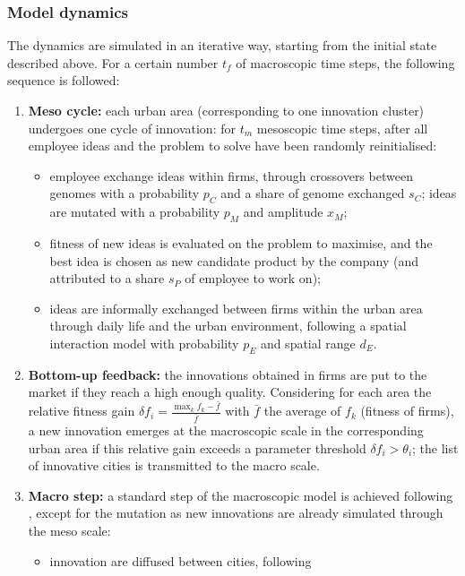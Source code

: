 \documentclass[letterpaper]{article}
\begin{document}
\subsubsection{Model dynamics}

The dynamics are simulated in an iterative way, starting from the initial state described above. For a certain number $t_f$ of macroscopic time steps, the following sequence is followed:

\begin{enumerate}
\item \textbf{Meso cycle:} each urban area (corresponding to one innovation cluster) undergoes one cycle of innovation: for $t_m$ mesoscopic time steps, after all employee ideas and the problem to solve have been randomly reinitialised:
    \begin{itemize}
        \item employee exchange ideas within firms, through crossovers between genomes with a probability $p_C$ and a share of genome exchanged $s_C$; ideas are mutated with a probability $p_M$ and amplitude $x_M$;
        \item fitness of new ideas is evaluated on the problem to maximise, and the best idea is chosen as new candidate product by the company (and attributed to a share $s_P$ of employee to work on);
        \item ideas are informally exchanged between firms within the urban area through daily life and the urban environment, following a spatial interaction model with probability $p_E$ and spatial range $d_E$.
    \end{itemize}
\item \textbf{Bottom-up feedback:} the innovations obtained in firms are put to the market if they reach a high enough quality. Considering for each area the relative fitness gain $\delta f_i = \frac{\max_k f_k - \bar{f}}{\bar{f}}$ with $\bar{f}$ the average of $f_k$ (fitness of firms), a new innovation emerges at the macroscopic scale in the corresponding urban area if this relative gain exceeds a parameter threshold $\delta f_i > \theta_i$; the list of innovative cities is transmitted to the macro scale.
\item \textbf{Macro step:} a standard step of the macroscopic model is achieved following \cite{raimbault2020model}, except for the mutation as new innovations are already simulated through the meso scale:
        \begin{itemize}
            \item innovation are diffused between cities, following

\end{itemize}
\end{enumerate}
\end{document}
